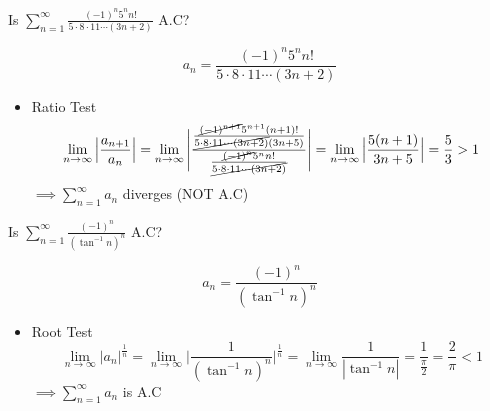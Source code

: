 \begin{eg}
Is \(\displaystyle \sum^{\infty}_{n = 1} \frac{(-1)^n 5^n n!}{5 \cdot 8 \cdot 11 \cdots (3n +2)}\) A.C?

\soln
\[\displaystyle a_n = \frac{(-1)^n 5^n n!}{5 \cdot 8 \cdot 11 \cdots (3n + 2)}\]
\begin{itemize}
\item Ratio Test
\[\displaystyle \lim_{n \to \infty} \Big| \frac{a_{n + 1}}{a_n} \Big| = \lim_{n \to \infty} \Bigg| \frac{\frac{\cancel{(-1)^{n +1}} 5^{n +1} (n + 1)!}{\cancel{5 \cdot 8 \cdot 11 \cdots (3n + 2)}(3n + 5)}}{\frac{\cancel{(-1)^n} 5^n n!}{\cancel{5 \cdot 8 \cdot 11 \cdots (3n + 2)}}} \Bigg| = \lim_{n \to \infty} \Big| \frac{5(n + 1)}{3n + 5} \Big| = \frac{5}{3} > 1\]
\(\displaystyle \implies \sum^{\infty}_{n = 1} a_n\) diverges (NOT A.C)
\end{itemize}
\end{eg}
\begin{eg}
Is \(\displaystyle \sum^{\infty}_{n = 1} \frac{(-1)^n}{(\tan^{-1} n)^n}\) A.C?

\soln
\[\displaystyle a_n = \frac{(-1)^n}{(\tan^{-1} n)^n}\]
\begin{itemize}
\item Root Test
\[\displaystyle \lim_{n \to \infty} \Big| a_n \Big|^{\frac{1}{n}} = \lim_{n \to \infty} \Big| \frac{1}{(\tan^{-1} n)^n} \Big|^{\frac{1}{n}} = \lim_{n \to \infty} \frac{1}{| \tan^{-1} n |} = \frac{1}{\frac{\pi}{2}} = \frac{2}{\pi} < 1\]
\(\displaystyle \implies \sum^{\infty}_{n = 1} a_n\) is A.C
\end{itemize}
\end{eg}
